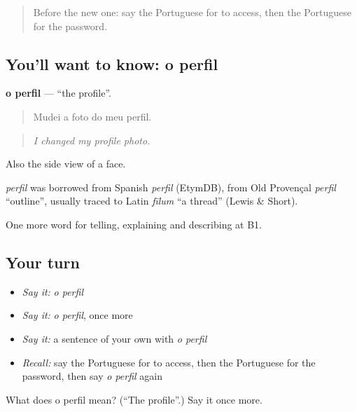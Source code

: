 \label{lesson:PT-C396-perfil}



\begin{quote}
Before the new one: say the Portuguese for to access, then the Portuguese for the password.
\end{quote}

\subsection*{You'll want to know: o perfil}
\textbf{o perfil} — \textquotedblleft{}the profile\textquotedblright{}.

\begin{quote}
Mudei a foto do meu perfil.
\end{quote}

\begin{quote}
\emph{I changed my profile photo.}
\end{quote}

Also the side view of a face.

\begin{cousinweb}
\emph{perfil} was borrowed from Spanish \emph{perfil} (EtymDB), from Old Provençal \emph{perfil} \textquotedblleft{}outline\textquotedblright{}, usually traced to Latin \emph{fīlum} \textquotedblleft{}a thread\textquotedblright{} (Lewis \& Short).
\end{cousinweb}

\begin{grammarlens}[title={What you've built}]
One more word for telling, explaining and describing at B1.
\end{grammarlens}

\subsection*{Your turn}
\begin{itemize}
\raggedright
  \item \emph{Say it:} \emph{o perfil}
  \item \emph{Say it:} \emph{o perfil}, once more
  \item \emph{Say it:} a sentence of your own with \emph{o perfil}
  \item \emph{Recall:} say the Portuguese for to access, then the Portuguese for the password, then say \emph{o perfil} again
\end{itemize}

\begin{tcolorbox}[breakable,colback=teal!4,colframe=teal!35!black,title={Before you move on}]
What does o perfil mean? (\textquotedblleft{}The profile\textquotedblright{}.) Say it once more.
\end{tcolorbox}
